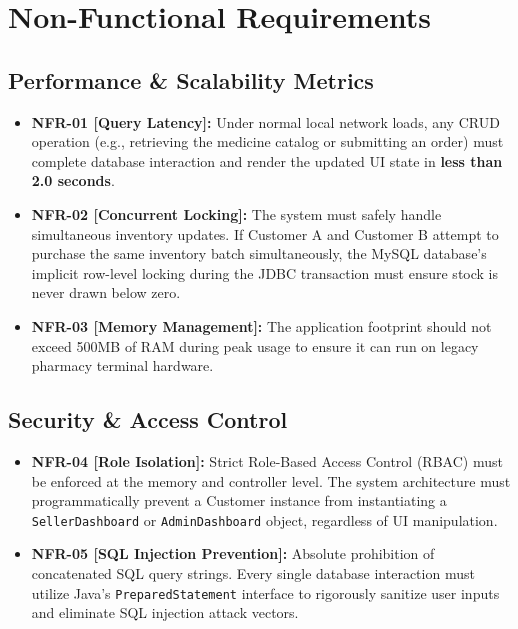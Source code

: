 \documentclass[12pt,a4paper]{report}
\begin{document}
\clearpage

\chapter{Non-Functional Requirements}

\section{Performance \& Scalability Metrics}
\begin{itemize}
    \item \textbf{NFR-01 [Query Latency]:} Under normal local network loads, any CRUD operation (e.g., retrieving the medicine catalog or submitting an order) must complete database interaction and render the updated UI state in \textbf{less than 2.0 seconds}.
    \item \textbf{NFR-02 [Concurrent Locking]:} The system must safely handle simultaneous inventory updates. If Customer A and Customer B attempt to purchase the same inventory batch simultaneously, the MySQL database's implicit row-level locking during the JDBC transaction must ensure stock is never drawn below zero.
    \item \textbf{NFR-03 [Memory Management]:} The application footprint should not exceed 500MB of RAM during peak usage to ensure it can run on legacy pharmacy terminal hardware.
\end{itemize}

\section{Security \& Access Control}
\begin{itemize}
    \item \textbf{NFR-04 [Role Isolation]:} Strict Role-Based Access Control (RBAC) must be enforced at the memory and controller level. The system architecture must programmatically prevent a Customer instance from instantiating a \texttt{SellerDashboard} or \texttt{AdminDashboard} object, regardless of UI manipulation.
    \item \textbf{NFR-05 [SQL Injection Prevention]:} Absolute prohibition of concatenated SQL query strings. Every single database interaction must utilize Java's \texttt{PreparedStatement} interface to rigorously sanitize user inputs and eliminate SQL injection attack vectors.
\end{itemize}
\end{document}
